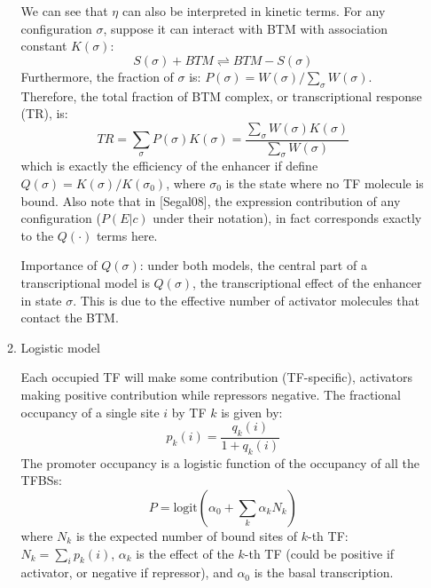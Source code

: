 \documentclass[11pt]{article}
\begin{document}
\begin{enumerate}
\begin{enumerate}
We can see that $\eta$ can also be interpreted in kinetic terms. For any configuration $\sigma$, suppose it can interact with BTM with association constant $K(\sigma)$: 
\begin{equation}
S(\sigma) + BTM \rightleftharpoons BTM-S(\sigma)
\end{equation}
Furthermore, the fraction of $\sigma$ is: $P(\sigma) = {W(\sigma)}/{\sum_{\sigma}W(\sigma)}$. Therefore, the total fraction of BTM complex, or transcriptional response (TR), is: 
\begin{equation}
TR = \sum_{\sigma}P(\sigma) K(\sigma) = \frac{\sum_{\sigma}W(\sigma) K(\sigma)}{\sum_{\sigma}W(\sigma)}
\end{equation}
which is exactly the efficiency of the enhancer if define $Q(\sigma) = K(\sigma) / K(\sigma_0)$, where $\sigma_0$ is the state where no TF molecule is bound. Also note that in [Segal08], the expression contribution of any configuration ($P(E|c)$ under their notation), in fact corresponds exactly to the $Q(\cdot)$ terms here. 

Importance of $Q(\sigma)$: under both models, the central part of a transcriptional model is $Q(\sigma)$, the transcriptional effect of the enhancer in state $\sigma$. This is due to the effective number of activator molecules that contact the BTM. 


\item{Logistic model}

Each occupied TF will make some contribution (TF-specific), activators making positive contribution while repressors negative. The fractional occupancy of a single site $i$ by TF $k$ is given by: 
\begin{equation}
p_k(i) = \frac{q_k(i)}{1 + q_k(i)}
\end{equation}
The promoter occupancy is a logistic function of the occupancy of all the TFBSs: 
\begin{equation}
P = \text{logit}(\alpha_0 + \sum_{k}\alpha_k N_k)
\end{equation} 
where $N_k$ is the expected number of bound sites of $k$-th TF: $N_k = \sum_i{p_k(i)}$, $\alpha_k$ is the effect of the $k$-th TF (could be positive if activator, or negative if repressor), and $\alpha_0$ is the basal transcription. 


\end{enumerate}
\end{enumerate}
\end{document}
